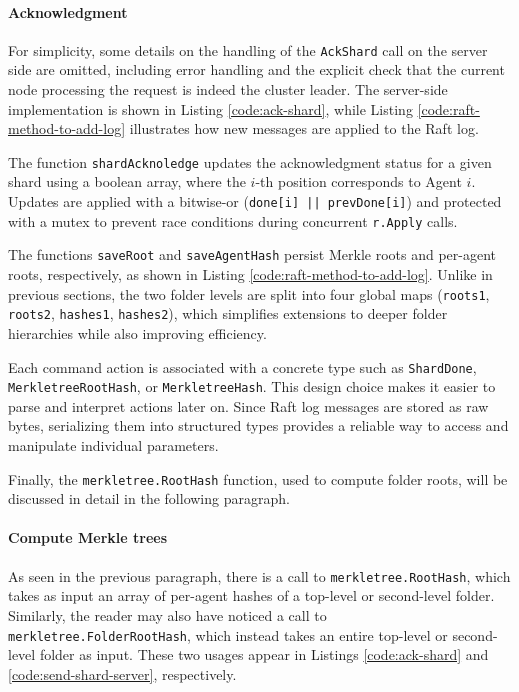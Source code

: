 \paragraph{Acknowledgment}

For simplicity, some details on the handling of the \texttt{AckShard} call on the server side are omitted, including error handling and the explicit check that the current node processing the request is indeed the cluster leader. The server-side implementation is shown in Listing \ref{code:ack-shard}, while Listing \ref{code:raft-method-to-add-log} illustrates how new messages are applied to the Raft log.

The function \texttt{shardAcknoledge} updates the acknowledgment status for a
given shard using a boolean array, where the $i$-th position corresponds to
Agent $i$. Updates are applied with a bitwise-or (\texttt{done[i] || prevDone[i]}) and protected with a mutex to prevent race conditions during concurrent \texttt{r.Apply} calls.

The functions \texttt{saveRoot} and \texttt{saveAgentHash} persist Merkle roots and per-agent roots, respectively, as shown in Listing \ref{code:raft-method-to-add-log}. Unlike in previous sections, the two folder levels are split into four global maps (\texttt{roots1}, \texttt{roots2}, \texttt{hashes1}, \texttt{hashes2}), which simplifies extensions to deeper folder hierarchies while also improving efficiency.

Each command action is associated with a concrete type such as \texttt{ShardDone}, \texttt{MerkletreeRootHash}, or \texttt{MerkletreeHash}. This design choice makes it easier to parse and interpret actions later on. Since Raft log messages are stored as raw bytes, serializing them into structured types provides a reliable way to access and manipulate individual parameters.

Finally, the \texttt{merkletree.RootHash} function, used to compute folder roots, will be discussed in detail in the following paragraph.

\paragraph{Compute Merkle trees}

As seen in the previous paragraph, there is a call to \texttt{merkletree.RootHash}, which
takes as input an array of per-agent hashes of a top-level or second-level folder. 
Similarly, the reader may also have noticed a call to 
\texttt{merkletree.FolderRootHash}, which instead takes an entire top-level or second-level
folder as input. These two usages appear in Listings \ref{code:ack-shard} and
\ref{code:send-shard-server}, respectively.  

